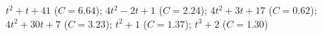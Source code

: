$t^{2}+t+41$ ($C=6.64$); $4t^{2}-2t+1$ ($C=2.24$); $4t^{2}+3t+17$ ($C=0.62$); $4t^{2}+30t+7$ ($C=3.23$); $t^{2}+1$ ($C=1.37$); $t^{3}+2$ ($C=1.30$)
